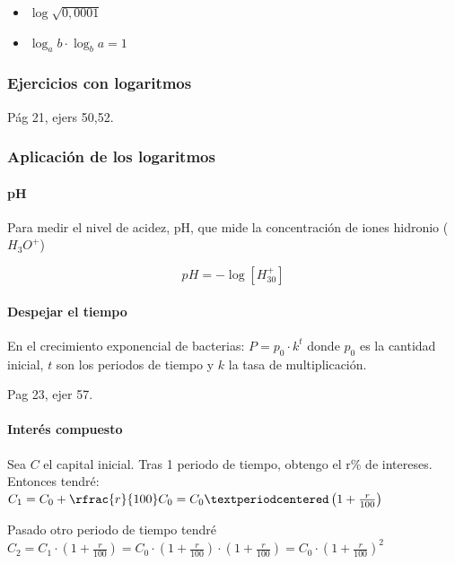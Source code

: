 \begin{itemize}
	\item $\log \sqrt{0,0001}$
	\item {} $\log_a b · \log_b a = 1$ 
\end{itemize}

\subsubsection{Ejercicios con logaritmos}
Pág 21, ejers 50,52.

\subsubsection{Aplicación de los logaritmos}

\paragraph{pH}

Para medir el nivel de acidez, pH, que mide la concentración de iones hidronio ($H_3O^+$)

\[pH=-\log[H_30^+]\]

\paragraph*{Despejar el tiempo} En el crecimiento exponencial de bacterias:
$P = p_0·k^t$ donde $p_0$ es la cantidad inicial, $t$ son los periodos de tiempo y $k$ la tasa de multiplicación.

Pag 23, ejer 57.

\paragraph{Interés compuesto}


Sea $C$ el capital inicial. Tras 1 periodo de tiempo, obtengo el r\% de intereses. Entonces tendré: $C_1 = C_0 + \rfrac{r}{100}C_0 = C_0·\left(1+\frac{r}{100}\right)$

Pasado otro periodo de tiempo tendré $C_2 = C_1·\left(1+\frac{r}{100}\right) = C_0·\left(1+\frac{r}{100}\right)·\left(1+\frac{r}{100}\right) = C_0 ·\left(1+\frac{r}{100}\right)^2$

